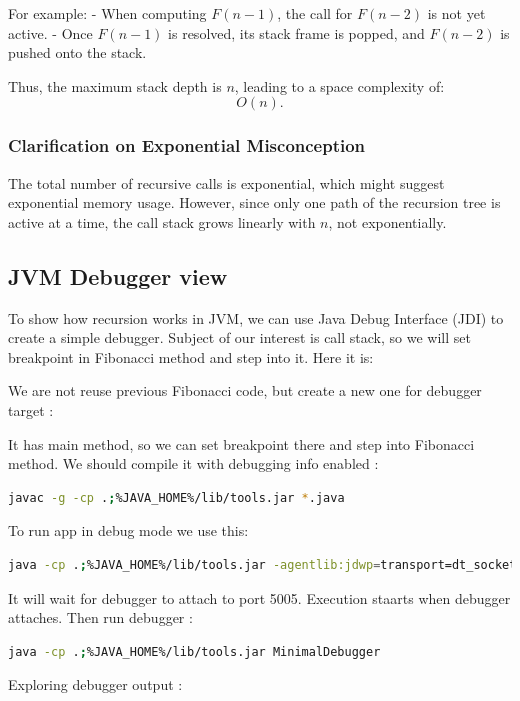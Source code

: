 \documentclass{article}
\begin{document}
For example:
- When computing \( F(n-1) \), the call for \( F(n-2) \) is not yet active.
- Once \( F(n-1) \) is resolved, its stack frame is popped, and \( F(n-2) \) is pushed onto the stack.

Thus, the maximum stack depth is \( n \), leading to a space complexity of:
\[
O(n).
\]

\subsubsection{Clarification on Exponential Misconception}
The total number of recursive calls is exponential, which might suggest exponential memory usage. However, since only one path of the recursion tree is active at a time, the call stack grows linearly with \( n \), not exponentially.

\subsection{JVM Debugger view}
To show how recursion works in JVM, we can use Java Debug Interface (JDI) to create a simple debugger. Subject of our interest is call stack, so we will set breakpoint in Fibonacci method and step into it.
Here it is:

We are not reuse previous Fibonacci code, but create a new one for debugger target :

It has main method, so we can set breakpoint there and step into Fibonacci method.
We should compile it with debugging info enabled :
\begin{lstlisting}[language=bash]
	javac -g -cp .;%JAVA_HOME%/lib/tools.jar *.java
\end{lstlisting}
To run app in debug mode we use this: 
\begin{lstlisting}[language=bash]
	java -cp .;%JAVA_HOME%/lib/tools.jar -agentlib:jdwp=transport=dt_socket,server=y,suspend=y,address=5005 FibonacciTarget
\end{lstlisting}
It will wait for debugger to attach to port 5005. Execution staarts when debugger attaches.
Then run debugger : 
\begin{lstlisting}[language=bash]
	java -cp .;%JAVA_HOME%/lib/tools.jar MinimalDebugger
\end{lstlisting}

Exploring debugger output : 

\end{document}
